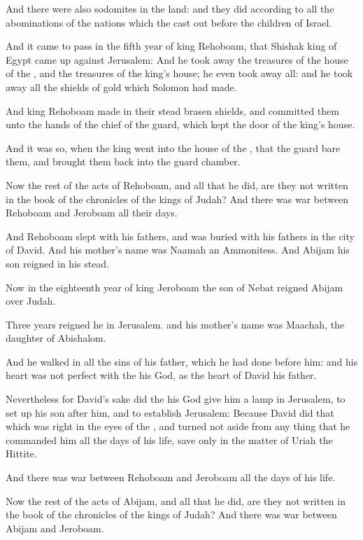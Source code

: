 \Verse And there were also sodomites in the land: and they did according to all the abominations of the nations which the \LORD cast out before the children of Israel.

\Verse And it came to pass in the fifth year of king Rehoboam, that Shishak king of Egypt came up against Jerusalem: \Verse And he took away the treasures of the house of the \LORD, and the treasures of the king's house; he even took away all: and he took away all the shields of gold which Solomon had made.

\Verse And king Rehoboam made in their stead brasen shields, and committed them unto the hands of the chief of the guard, which kept the door of the king's house.

\Verse And it was so, when the king went into the house of the \LORD, that the guard bare them, and brought them back into the guard chamber.

\Verse Now the rest of the acts of Rehoboam, and all that he did, are they not written in the book of the chronicles of the kings of Judah?  \Verse And there was war between Rehoboam and Jeroboam all their days.

\Verse And Rehoboam slept with his fathers, and was buried with his fathers in the city of David. And his mother's name was Naamah an Ammonitess. And Abijam his son reigned in his stead.


\Chapter
\Verse Now in the eighteenth year of king Jeroboam the son of Nebat reigned Abijam over Judah.

\Verse Three years reigned he in Jerusalem. and his mother's name was Maachah, the daughter of Abishalom.

\Verse And he walked in all the sins of his father, which he had done before him: and his heart was not perfect with the \LORD his God, as the heart of David his father.

\Verse Nevertheless for David's sake did the \LORD his God give him a lamp in Jerusalem, to set up his son after him, and to establish Jerusalem: \Verse Because David did that which was right in the eyes of the \LORD, and turned not aside from any thing that he commanded him all the days of his life, save only in the matter of Uriah the Hittite.

\Verse And there was war between Rehoboam and Jeroboam all the days of his life.

\Verse Now the rest of the acts of Abijam, and all that he did, are they not written in the book of the chronicles of the kings of Judah? And there was war between Abijam and Jeroboam.

